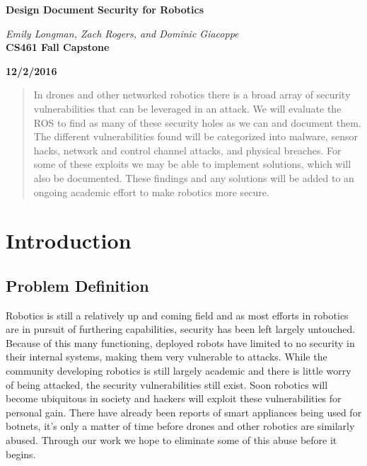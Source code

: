 \documentclass[IEEEtran,letterpaper,10pt,notitlepage,draftclsnofoot,onecolumn]{article}
\begin{document}
\begin{titlingpage}
  \begin{center}
    \vspace*{1cm}

    \huge
    \textbf{Design Document}
    \textbf{Security for Robotics}
  \vspace{0.5cm}

    \textit{Emily Longman, Zach Rogers, and Dominic Giacoppe}\\
  \vspace{2cm}
    \large
    \textbf{CS461 Fall Capstone}\\
  \vspace{5mm}

    \textbf{12/2/2016}\\
  \vspace{5cm}

    \begin{abstract}
      In drones and other networked robotics there is a broad array of security vulnerabilities that can be leveraged in an attack.
      We will evaluate the ROS to find as many of these security holes as we can and document them.
      The different vulnerabilities found will be categorized into malware, sensor hacks, network and control channel attacks, and physical breaches.
      For some of these exploits we may be able to implement solutions, which will also be documented.
      These findings and any solutions will be added to an ongoing academic effort to make robotics more secure.
    \end{abstract}

    \end{center}
\end{titlingpage}

\section{Introduction}
\subsection{Problem Definition}
Robotics is still a relatively up and coming field and as most efforts in robotics are in pursuit of furthering capabilities, security has been left largely untouched. 
Because of this many functioning, deployed robots have limited to no security in their internal systems, making them very vulnerable to attacks.
While the community developing robotics is still largely academic and there is little worry of being attacked, the security vulnerabilities still exist. 
Soon robotics will become ubiquitous in society and hackers will exploit these vulnerabilities for personal gain.
There have already been reports of smart appliances being used for botnets, it's only a matter of time before drones and other robotics are similarly abused.
Through our work we hope to eliminate some of this abuse before it begins.
\end{document}
